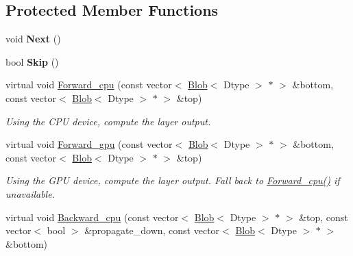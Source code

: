 \subsection*{Protected Member Functions}
\begin{DoxyCompactItemize}
\item 
void {\bfseries Next} ()\hypertarget{classcaffe_1_1HDF5DataLayer_a06dd19f9e75448e649bd6d1bdf628879}{}\label{classcaffe_1_1HDF5DataLayer_a06dd19f9e75448e649bd6d1bdf628879}

\item 
bool {\bfseries Skip} ()\hypertarget{classcaffe_1_1HDF5DataLayer_ad8fcb05eb70f5230d34b4dc1e641bc7b}{}\label{classcaffe_1_1HDF5DataLayer_ad8fcb05eb70f5230d34b4dc1e641bc7b}

\item 
virtual void \hyperlink{classcaffe_1_1HDF5DataLayer_ae95656f7e015d0df62fc20d848786034}{Forward\+\_\+cpu} (const vector$<$ \hyperlink{classcaffe_1_1Blob}{Blob}$<$ Dtype $>$ $\ast$ $>$ \&bottom, const vector$<$ \hyperlink{classcaffe_1_1Blob}{Blob}$<$ Dtype $>$ $\ast$ $>$ \&top)\hypertarget{classcaffe_1_1HDF5DataLayer_ae95656f7e015d0df62fc20d848786034}{}\label{classcaffe_1_1HDF5DataLayer_ae95656f7e015d0df62fc20d848786034}

\begin{DoxyCompactList}\small\item\em Using the C\+PU device, compute the layer output. \end{DoxyCompactList}\item 
virtual void \hyperlink{classcaffe_1_1HDF5DataLayer_a5732f15bc27b14bd2ba09413e05385db}{Forward\+\_\+gpu} (const vector$<$ \hyperlink{classcaffe_1_1Blob}{Blob}$<$ Dtype $>$ $\ast$ $>$ \&bottom, const vector$<$ \hyperlink{classcaffe_1_1Blob}{Blob}$<$ Dtype $>$ $\ast$ $>$ \&top)\hypertarget{classcaffe_1_1HDF5DataLayer_a5732f15bc27b14bd2ba09413e05385db}{}\label{classcaffe_1_1HDF5DataLayer_a5732f15bc27b14bd2ba09413e05385db}

\begin{DoxyCompactList}\small\item\em Using the G\+PU device, compute the layer output. Fall back to \hyperlink{classcaffe_1_1HDF5DataLayer_ae95656f7e015d0df62fc20d848786034}{Forward\+\_\+cpu()} if unavailable. \end{DoxyCompactList}\item 
virtual void \hyperlink{classcaffe_1_1HDF5DataLayer_a7239ed842b4e80c3bdf2b006eecde34a}{Backward\+\_\+cpu} (const vector$<$ \hyperlink{classcaffe_1_1Blob}{Blob}$<$ Dtype $>$ $\ast$ $>$ \&top, const vector$<$ bool $>$ \&propagate\+\_\+down, const vector$<$ \hyperlink{classcaffe_1_1Blob}{Blob}$<$ Dtype $>$ $\ast$ $>$ \&bottom)\hypertarget{classcaffe_1_1HDF5DataLayer_a7239ed842b4e80c3bdf2b006eecde34a}{}\label{classcaffe_1_1HDF5DataLayer_a7239ed842b4e80c3bdf2b006eecde34a}


\end{DoxyCompactItemize}
